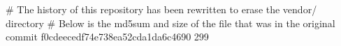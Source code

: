 # The history of this repository has been rewritten to erase the vendor/ directory
# Below is the md5sum and size of the file that was in the original commit
f0cdeecedf74e738ea52cda1da6c4690
299
